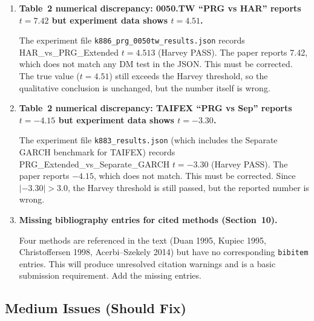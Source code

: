 \documentclass[12pt,a4paper]{article}
\begin{document}
\begin{enumerate}[label=\textbf{S\arabic*}]

\item \textbf{Table~2 numerical discrepancy: 0050.TW ``PRG vs HAR'' reports $t = 7.42$ but experiment data shows $t = 4.51$.}

The experiment file \texttt{k886\_prg\_0050tw\_results.json} records HAR\_vs\_PRG\_Extended $t = 4.513$ (Harvey PASS). The paper reports 7.42, which does not match any DM test in the JSON. This must be corrected. The true value ($t = 4.51$) still exceeds the Harvey threshold, so the qualitative conclusion is unchanged, but the number itself is wrong.

\item \textbf{Table~2 numerical discrepancy: TAIFEX ``PRG vs Sep'' reports $t = -4.15$ but experiment data shows $t = -3.30$.}

The experiment file \texttt{k883\_results.json} (which includes the Separate GARCH benchmark for TAIFEX) records PRG\_Extended\_vs\_Separate\_GARCH $t = -3.30$ (Harvey PASS). The paper reports $-4.15$, which does not match. This must be corrected. Since $|-3.30| > 3.0$, the Harvey threshold is still passed, but the reported number is wrong.

\item \textbf{Missing bibliography entries for cited methods (Section~10).}

Four methods are referenced in the text (Duan 1995, Kupiec 1995, Christoffersen 1998, Acerbi--Szekely 2014) but have no corresponding \texttt{bibitem} entries. This will produce unresolved citation warnings and is a basic submission requirement. Add the missing entries.

\end{enumerate}

\subsection*{\textcolor{warncolor}{Medium Issues (Should Fix)}}
\end{document}
